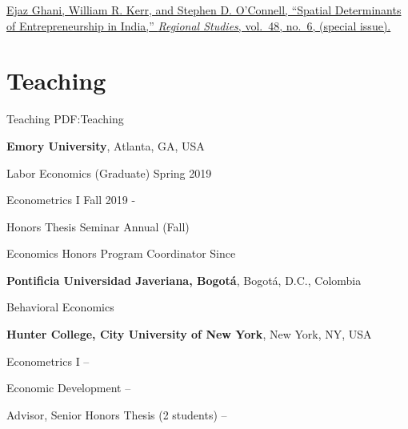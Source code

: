 \documentclass[letterpaper,10pt,oneside]{article}
\begin{document}
\begin{body}
\EntryGapNoBreak

\href{http://www.stephenoconnell.org/files/Ghani_Kerr_OConnell_RS_2013.pdf}
{Ejaz Ghani, William R. Kerr, and Stephen D. O'Connell,
``Spatial Determinants of Entrepreneurship in India,''
\textit{Regional Studies},
vol.~48,
no.~6,
 (special issue).} 

 


\section
{Teaching}
{Teaching}
{PDF:Teaching}

\textbf{Emory University},
Atlanta, GA, USA
\par
Labor Economics (Graduate)
\hfill
Spring 2019

Econometrics I
\hfill
Fall 2019 -        


\par
Honors Thesis Seminar
\hfill
Annual (Fall)

\par
Economics Honors Program Coordinator
\hfill
Since 

\smallskip
\smallskip


\textbf{Pontificia Universidad Javeriana, Bogot\'{a}},
Bogot\'{a}, D.C., Colombia
\par
Behavioral Economics
\hfill
{}

\smallskip
\smallskip

\textbf{Hunter College, City University of New York},
New York, NY, USA
\par
Econometrics I
\hfill
{} --
\par
Economic Development
\hfill
{} --
\par
Advisor, Senior Honors Thesis (2 students)
\hfill
{} --




\end{body}
\end{document}
